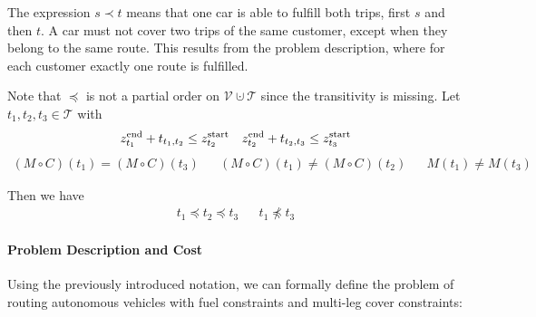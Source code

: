 The expression $s\prec t$ means that one car is able to fulfill both trips, first $s$ and then $t$. A car must not cover two trips of the same customer, except when they belong to the same route. This results from the problem description, where for each customer exactly one route is fulfilled. 

\begin{remark}

Note that $\preceq$ is not a partial order on $\mathcal{V}\cupdot\mathcal{T}$ since the transitivity is missing. Let $t_1,t_2,t_3\in\mathcal{T}$ with 
\begin{align*}
	z^{\operatorname{end}}_{t_1} + t_{t_1,t_2} \leq z^{\operatorname{start}}_{t_2} && z^{\operatorname{end}}_{t_2} + t_{t_2,t_3} \leq z^{\operatorname{start}}_{t_3}
\end{align*}
\begin{align*}
	(M\circ C)\left(t_1\right) = (M\circ C)\left(t_3\right) && (M\circ C)\left(t_1\right) \neq (M\circ C)\left(t_2\right) && M\left(t_1\right)\neq M\left(t_3\right)
\end{align*}

Then we have
\begin{align*}
	t_1 \preceq t_2 \preceq t_3 && t_1 \not\preceq t_3
\end{align*}

\end{remark}

\paragraph{Problem Description and Cost} \parfill

Using the previously introduced notation, we can formally define the problem of routing autonomous vehicles with fuel constraints and multi-leg cover constraints:

